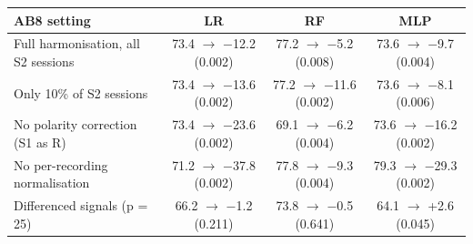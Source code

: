 \begin{tabular}{lccc}
\toprule
\textbf{AB8 setting} & \textbf{LR} & \textbf{RF} & \textbf{MLP} \\
\midrule
Full harmonisation, all S2 sessions & 73.4 $\rightarrow$ $-$12.2 (0.002) & 77.2 $\rightarrow$ $-$5.2 (0.008) & 73.6 $\rightarrow$ $-$9.7 (0.004) \\
Only 10\% of S2 sessions & 73.4 $\rightarrow$ $-$13.6 (0.002) & 77.2 $\rightarrow$ $-$11.6 (0.002) & 73.6 $\rightarrow$ $-$8.1 (0.006) \\
No polarity correction (S1 as R) & 73.4 $\rightarrow$ $-$23.6 (0.002) & 69.1 $\rightarrow$ $-$6.2 (0.004) & 73.6 $\rightarrow$ $-$16.2 (0.002) \\
No per-recording normalisation & 71.2 $\rightarrow$ $-$37.8 (0.002) & 77.8 $\rightarrow$ $-$9.3 (0.004) & 79.3 $\rightarrow$ $-$29.3 (0.002) \\
Differenced signals (p = 25) & 66.2 $\rightarrow$ $-$1.2 (0.211) & 73.8 $\rightarrow$ $-$0.5 (0.641) & 64.1 $\rightarrow$ +2.6 (0.045) \\
\bottomrule
\end{tabular}
